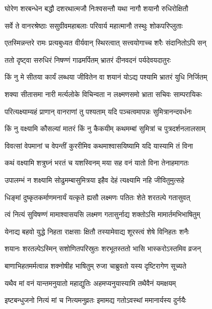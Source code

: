
\twolineshloka
{घोरेण शरबन्धेन बद्धौ दशरथात्मजौ}
{निःश्वसन्तौ यथा नागौ शयानौ रुधिरोक्षितौ} %

\twolineshloka
{सर्वे ते वानरश्रेष्ठाः ससुग्रीवमहाबलाः}
{परिवार्य महात्मानौ तस्थुः शोकपरिप्लुताः} %

\twolineshloka
{एतस्मिन्नन्तरे रामः प्रत्यबुध्यत वीर्यवान्}
{स्थिरत्वात् सत्त्वयोगाच्च शरैः संदानितोऽपि सन्} %

\twolineshloka
{ततो दृष्ट्वा सरुधिरं निषण्णं गाढमर्पितम्}
{भ्रातरं दीनवदनं पर्यदेवयदातुरः} %

\twolineshloka
{किं नु मे सीतया कार्यं लब्धया जीवितेन वा}
{शयानं योऽद्य पश्यामि भ्रातरं युधि निर्जितम्} %

\twolineshloka
{शक्या सीतासमा नारी मर्त्यलोके विचिन्वता}
{न लक्ष्मणसमो भ्राता सचिवः साम्परायिकः} %

\twolineshloka
{परित्यक्ष्याम्यहं प्राणान् वानराणां तु पश्यताम्}
{यदि पञ्चत्वमापन्नः सुमित्रानन्दवर्धनः} %

\twolineshloka
{किं नु वक्ष्यामि कौसल्यां मातरं किं नु कैकयीम्}
{कथमम्बां सुमित्रां च पुत्रदर्शनलालसाम्} %

\twolineshloka
{विवत्सां वेपमानां च वेपन्तीं कुररीमिव}
{कथमाश्वासयिष्यामि यदि यास्यामि तं विना} %

\twolineshloka
{कथं वक्ष्यामि शत्रुघ्नं भरतं च यशस्विनम्}
{मया सह वनं यातो विना तेनाहमागतः} %

\twolineshloka
{उपालम्भं न शक्ष्यामि सोढुमम्बासुमित्रया}
{इहैव देहं त्यक्ष्यामि नहि जीवितुमुत्सहे} %

\twolineshloka
{धिङ्मां दुष्कृतकर्माणमनार्यं यत्कृते ह्यसौ}
{लक्ष्मणः पतितः शेते शरतल्पे गतासुवत्} %

\twolineshloka
{त्वं नित्यं सुविषण्णं मामाश्वासयसि लक्ष्मण}
{गतासुर्नाद्य शक्तोऽसि मामार्तमभिभाषितुम्} %

\twolineshloka
{येनाद्य बहवो युद्धे निहता राक्षसाः क्षितौ}
{तस्यामेवाद्य शूरस्त्वं शेषे विनिहतः शनैः} %

\twolineshloka
{शयानः शरतल्पेऽस्मिन् सशोणितपरिस्रुतः}
{शरभूतस्ततो भासि भास्करोऽस्तमिव व्रजन्} %

\twolineshloka
{बाणाभिहतमर्मत्वान्न शक्नोषीह भाषितुम्}
{रुजा चाब्रुवतो यस्य दृष्टिरागेण सूच्यते} %

\twolineshloka
{यथैव मां वनं यान्तमनुयातो महाद्युतिः}
{अहमप्यनुयास्यामि तथैवैनं यमक्षयम्} %

\twolineshloka
{इष्टबन्धुजनो नित्यं मां च नित्यमनुव्रतः}
{इमामद्य गतोऽवस्थां ममानार्यस्य दुर्नयैः} %


